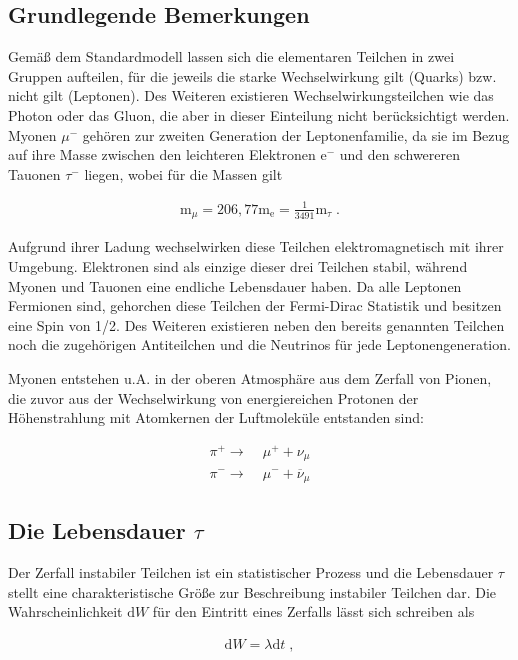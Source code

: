 \subsection{Grundlegende Bemerkungen}
Gemäß dem Standardmodell lassen sich die elementaren Teilchen in zwei Gruppen aufteilen, für die jeweils die starke Wechselwirkung gilt (Quarks) bzw. nicht gilt (Leptonen). Des Weiteren existieren  Wechselwirkungsteilchen wie das Photon oder das Gluon, die aber in dieser Einteilung nicht berücksichtigt werden. Myonen $\mu^-$ gehören zur zweiten Generation der Leptonenfamilie, da sie im Bezug auf ihre Masse zwischen den leichteren Elektronen $\textrm{e}^-$ und den schwereren Tauonen $\tau^-$ liegen, wobei für die Massen gilt

\begin{align}
\textrm{m}_\mu = 206,77 \textrm{m}_{\textrm{e}} = \frac{1}{3491}\textrm{m}_{\tau}\;.
\end{align}

Aufgrund ihrer Ladung wechselwirken diese Teilchen elektromagnetisch mit ihrer Umgebung. Elektronen sind als einzige dieser drei Teilchen stabil, während Myonen und Tauonen eine endliche Lebensdauer haben. Da alle Leptonen Fermionen sind, gehorchen diese Teilchen der Fermi-Dirac Statistik und besitzen eine Spin von 1/2. Des Weiteren existieren neben den bereits genannten Teilchen noch die zugehörigen Antiteilchen und die Neutrinos für jede Leptonengeneration.

Myonen entstehen u.A. in der oberen Atmosphäre aus dem Zerfall von Pionen, die zuvor aus der Wechselwirkung von energiereichen Protonen der Höhenstrahlung mit Atomkernen der Luftmoleküle entstanden sind:

\begin{align}
\pi^+ \longrightarrow &\; \mu^+ + \nu_\mu \\
\pi^- \longrightarrow &\; \mu^- + \overline{\nu}_\mu 
\end{align}

\subsection{Die Lebensdauer $\tau$}
Der Zerfall instabiler Teilchen ist ein statistischer Prozess und die Lebensdauer $\tau$ stellt eine charakteristische Größe zur Beschreibung instabiler Teilchen dar. Die Wahrscheinlichkeit $\textrm{d}W$ für den Eintritt eines Zerfalls lässt sich schreiben als
 
\begin{align}
\textrm{d}W = \lambda \textrm{d}t \;, \label{eqn:WSK}
\end{align}

